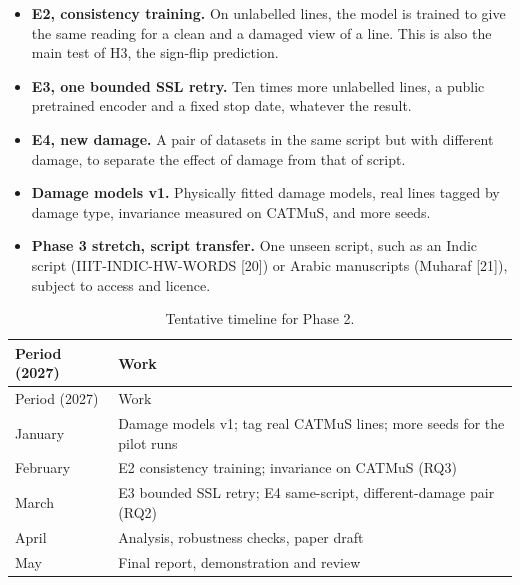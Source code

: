 \documentclass[
  12pt,
  a4paper,
]{report}
\providecommand{\tightlist}{%
  \setlength{\itemsep}{0pt}\setlength{\parskip}{0pt}}
\begin{document}
\begin{itemize}
\tightlist
\item
  \textbf{E2, consistency training.} On unlabelled lines, the model is
  trained to give the same reading for a clean and a damaged view of a
  line. This is also the main test of H3, the sign-flip prediction.
\item
  \textbf{E3, one bounded SSL retry.} Ten times more unlabelled lines, a
  public pretrained encoder and a fixed stop date, whatever the result.
\item
  \textbf{E4, new damage.} A pair of datasets in the same script but
  with different damage, to separate the effect of damage from that of
  script.
\item
  \textbf{Damage models v1.} Physically fitted damage models, real lines
  tagged by damage type, invariance measured on CATMuS, and more seeds.
\item
  \textbf{Phase 3 stretch, script transfer.} One unseen script, such as
  an Indic script (IIIT-INDIC-HW-WORDS {[}20{]}) or Arabic manuscripts
  (Muharaf {[}21{]}), subject to access and licence.
\end{itemize}

\begin{longtable}[]{@{}
  >{\raggedright\arraybackslash}p{}
  >{\raggedright\arraybackslash}p{}@{}}
\caption{Tentative timeline for Phase 2.}\tabularnewline
\toprule\noalign{}
\begin{minipage}[b]{\linewidth}\raggedright
Period (2027)
\end{minipage} & \begin{minipage}[b]{\linewidth}\raggedright
Work
\end{minipage} \\
\midrule\noalign{}
\endfirsthead
\toprule\noalign{}
\begin{minipage}[b]{\linewidth}\raggedright
Period (2027)
\end{minipage} & \begin{minipage}[b]{\linewidth}\raggedright
Work
\end{minipage} \\
\midrule\noalign{}
\endhead
\bottomrule\noalign{}
\endlastfoot
January & Damage models v1; tag real CATMuS lines; more seeds for the
pilot runs \\
February & E2 consistency training; invariance on CATMuS (RQ3) \\
March & E3 bounded SSL retry; E4 same-script, different-damage pair
(RQ2) \\
April & Analysis, robustness checks, paper draft \\
May & Final report, demonstration and review \\
\end{longtable}
\end{document}

